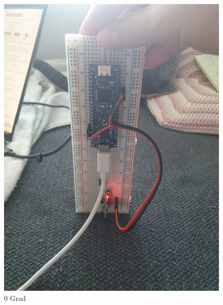 \begin{figure}[H]
  \centering
  \begin{minipage}[b]{0.29\textwidth}
    \centering
    \includegraphics[width=\textwidth, angle=-90]{assets/ET/Gyroskop/gyro-0-deg.jpg}
    \caption{0 Grad}
    \label{fig:gyro-0}
  \end{minipage}
  \hfill
  \begin{minipage}[b]{0.29\textwidth}
    \centering

\end{minipage}
\end{figure}

